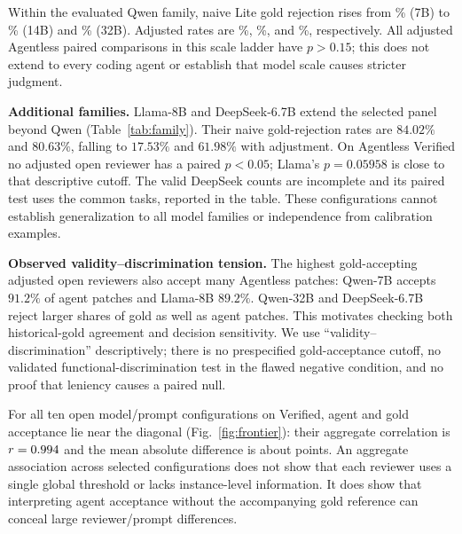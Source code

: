 \documentclass[10pt,conference]{IEEEtran}
\begin{document}
Within the evaluated Qwen family, naive Lite gold rejection rises from
\strictSevenFalseRejLite\% (7B) to \strictFalseRejLite\% (14B) and
\strictThirtyTwoFalseRejLite\% (32B). Adjusted rates are
\calSevenFalseRejLite\%, \calFalseRejLite\%, and \calThirtyTwoFalseRejLite\%, respectively.
All adjusted Agentless paired comparisons in this scale ladder have $p>0.15$; this does
not extend to every coding agent or establish that model scale causes stricter judgment.


\textbf{Additional families.} Llama-8B and DeepSeek-6.7B extend the selected panel beyond
Qwen (Table~\ref{tab:family}). Their naive gold-rejection rates are $84.02\%$ and $80.63\%$,
falling to $17.53\%$ and $61.98\%$ with adjustment. On Agentless Verified no adjusted open
reviewer has a paired $p<0.05$; Llama's $p=0.05958$ is close to that descriptive cutoff.
The valid DeepSeek counts are incomplete and its paired test uses the common tasks,
reported in the table. These configurations cannot establish generalization to all model
families or independence from calibration examples.

\begin{table}[t]
\centering
\caption{Cross-family reviewers on Verified. Rates use valid verdicts, and $n_a/n_g/n_p$ gives adjusted agent/gold/paired counts. Non-significant paired comparisons do not establish equivalence.}
\label{tab:family}
\small

\end{table}

\textbf{Observed validity--discrimination tension.} The highest gold-accepting adjusted
open reviewers also accept many Agentless patches: Qwen-7B accepts $91.2\%$ of agent patches
and Llama-8B $89.2\%$. Qwen-32B and DeepSeek-6.7B reject larger shares of gold as well as
agent patches. This motivates checking both historical-gold agreement and decision
sensitivity. We use ``validity--discrimination'' descriptively; there is no prespecified
gold-acceptance cutoff, no validated functional-discrimination test in the flawed negative
condition, and no proof that leniency causes a paired null.

For all ten open model/prompt configurations on Verified, agent and gold acceptance lie
near the diagonal (Fig.~\ref{fig:frontier}): their aggregate correlation is
$r=0.994$ and the mean absolute difference is about \dilemmaGap{} points.
An aggregate association across selected configurations does not show that each reviewer
uses a single global threshold or lacks instance-level information. It does show that
interpreting agent acceptance without the accompanying gold reference can conceal large
reviewer/prompt differences.
\end{document}
